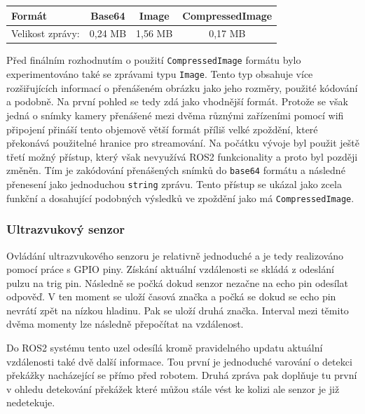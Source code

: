 \begin{center}
	\begin{tabular}{| l | c c c |}
		\hline
		Formát & Base64 & Image & CompressedImage \\ 
		\hline
		Velikost zprávy: & 0,24 MB & 1,56 MB & 0,17 MB  \\ 
		\hline 
	\end{tabular}
\end{center}

Před finálním rozhodnutím o použití \verb|CompressedImage| formátu bylo experimentováno také se zprávami typu \verb|Image|. Tento typ obsahuje více rozšiřujících informací o přenášeném obrázku jako jeho rozměry, použité kódování a podobně. Na první pohled se tedy zdá jako vhodnější formát. Protože se však jedná o snímky kamery přenášené mezi dvěma různými zařízeními pomocí wifi připojení přináší tento objemově větší formát příliš velké zpoždění, které překonává použitelné hranice pro streamování. Na počátku vývoje byl použit ještě třetí možný přístup, který však nevyužívá ROS2 funkcionality a proto byl později změněn. Tím je zakódování přenášených snímků do \verb|base64| formátu a následné přenesení jako jednoduchou \verb|string| zprávu. Tento přístup se ukázal jako zcela funkční a dosahující podobných výsledků ve zpoždění jako má \verb|CompressedImage|.
 
\subsubsection*{Ultrazvukový senzor}
Ovládání ultrazvukového senzoru je relativně jednoduché a je tedy realizováno pomocí práce s GPIO piny. Získání aktuální vzdálenosti se skládá z odeslání pulzu na trig pin. Následně se počká dokud senzor nezačne na echo pin odesílat odpověď. V ten moment se uloží časová značka a počká se dokud se echo pin nevrátí zpět na nízkou hladinu. Pak se uloží druhá značka. Interval mezi těmito dvěma momenty lze následně přepočítat na vzdálenost.

Do ROS2 systému tento uzel odesílá kromě pravidelného updatu aktuální vzdálenosti také dvě další informace. Tou první je jednoduché varování o detekci překážky nacházející se přímo před robotem. Druhá zpráva pak doplňuje tu první v ohledu detekování překážek které můžou stále vést ke kolizi ale senzor je již nedetekuje. 


